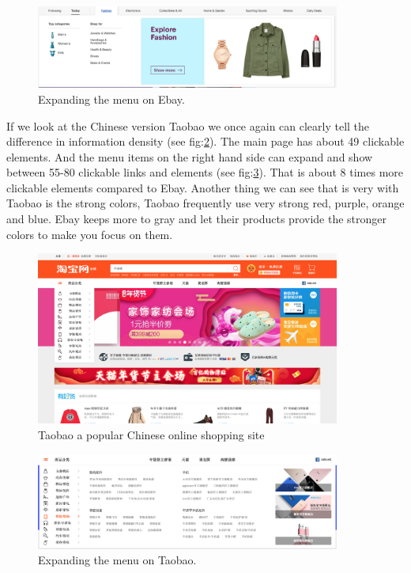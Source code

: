 \begin{figure}[h]
\centering
\includegraphics[width=100mm]{Images/ebay_menu.png}
\decoRule
\caption[Ebay's menu bar]{Expanding the menu on Ebay.}
\label{fig:ebay_menu}
\end{figure}

If we look at the Chinese version Taobao we once again can clearly tell the difference in information density (see fig:\ref{fig:taobao}). The main page has about 49 clickable elements. And the menu items on the right hand side can expand and show between 55-80 clickable links and elements (see fig:\ref{fig:taobao_menu}). That is about 8 times more clickable elements compared to Ebay. Another thing we can see that is very with Taobao is the strong colors, Taobao frequently use very strong red, purple, orange and blue. Ebay keeps more to gray and let their products provide the stronger colors to make you focus on them. 

\begin{figure}[h]
\centering
\includegraphics[width=100mm]{Images/Taobao}
\decoRule
\caption[Taobao]{Taobao a popular Chinese online shopping site}
\label{fig:taobao}
\end{figure}

\begin{figure}[h]
\centering
\includegraphics[width=100mm]{Images/Taobao_menu}
\decoRule
\caption[Taobao' menu bar]{Expanding the menu on Taobao.}
\label{fig:taobao_menu}
\end{figure}

